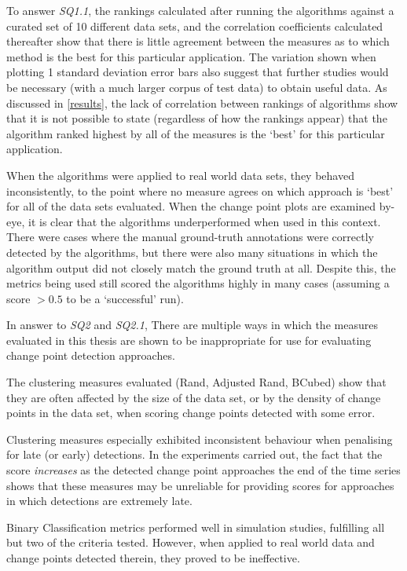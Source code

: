 \documentclass[../main.tex]{subfiles}
\begin{document}
To answer \emph{SQ1.1}, the rankings calculated after running the algorithms against a curated set of 10 different data sets, and the correlation coefficients calculated thereafter show that there is little agreement between the measures as to which method is the best for this particular application. The variation shown when plotting 1 standard deviation error bars also suggest that further studies would be necessary (with a much larger corpus of test data) to obtain useful data. As discussed in \autoref{results}, the lack of correlation between rankings of algorithms show that it is not possible to state (regardless of how the rankings appear) that the algorithm ranked highest by all of the measures is the `best' for this particular application.

When the algorithms were applied to real world data sets, they behaved inconsistently, to the point where no measure agrees on which approach is `best' for all of the data sets evaluated. When the change point plots are examined by-eye, it is clear that the algorithms underperformed when used in this context. There were cases where the manual ground-truth annotations were correctly detected by the algorithms, but there were also many situations in which the algorithm output did not closely match the ground truth at all. Despite this, the metrics being used still scored the algorithms highly in many cases (assuming a score $> 0.5$ to be a `successful' run).

In answer to \emph{SQ2} and \emph{SQ2.1},  There are multiple ways in which the measures evaluated in this thesis are shown to be inappropriate for use for evaluating change point detection approaches.

The clustering measures evaluated (Rand, Adjusted Rand, BCubed) show that they are often affected by the size of the data set, or by the density of change points in the data set, when scoring change points detected with some error.

Clustering measures especially exhibited inconsistent behaviour when penalising for late (or early) detections. In the experiments carried out, the fact that the score \emph{increases} as the detected change point approaches the end of the time series shows that these measures may be unreliable for providing scores for approaches in which detections are extremely late.

Binary Classification metrics performed well in simulation studies, fulfilling all but two of the criteria tested. However, when applied to real world data and change points detected therein, they proved to be ineffective.
\end{document}
